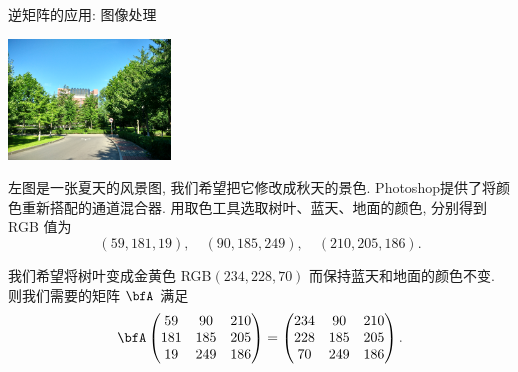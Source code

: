 \begin{frame}{逆矩阵的应用: 图像处理\noexer}
	\begin{minipage}{.35\textwidth}
		\includegraphics[height=32mm]{../image/ps_in.jpg}
	\end{minipage}
	\begin{minipage}{.57\textwidth}
		\onslide<+->
		左图是一张夏天的风景图, 我们希望把它修改成秋天的景色. 
		\onslide<+->
		Photoshop提供了将颜色重新搭配的通道混合器.
		\onslide<+->
		用取色工具选取树叶、蓝天、地面的颜色, 分别得到 RGB 值为
		\[(59,181,19),\quad (90,185,249),\quad (210,205,186).\]
	\end{minipage}

	\onslide<+->
	我们希望将树叶变成金黄色 RGB$(234,228,70)$ 而保持蓝天和地面的颜色不变.
	\onslide<+->
	则我们需要的矩阵 $\bfA$ 满足
	\[\bfA\begin{pmatrix}
		59&90&210\\
		181&185&205\\
		19&249&186
	\end{pmatrix}=\begin{pmatrix}
		234&90&210\\
		228&185&205\\
		70&249&186
	\end{pmatrix}.\]
\end{frame}



